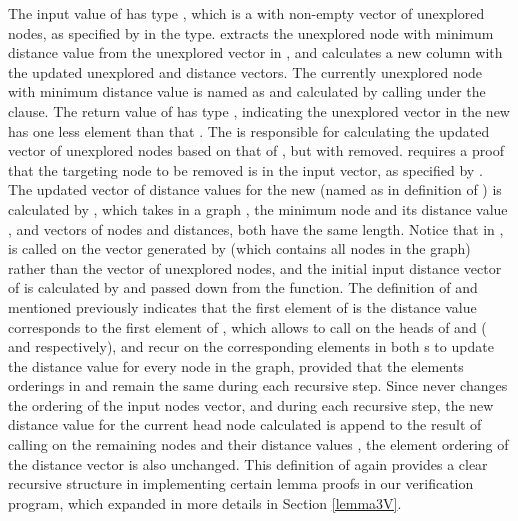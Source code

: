 The input value  of  has type , which is a  with non-empty vector of unexplored nodes, as specified by  in the type.  extracts the unexplored node with minimum distance value from the unexplored vector in , and calculates a new column with the updated unexplored and distance vectors. The currently unexplored node with minimum distance value is named as  and calculated by calling  under the  clause. The return value of  has type , indicating the unexplored vector in the new  has one less element than that . The  is responsible for calculating the updated vector of unexplored nodes based on that of , but with  removed.  requires a proof that the targeting node to be removed is in the input vector, as specified by . 
\\

The updated vector of distance values for the new (named as  in definition of ) is calculated by , which takes in a graph , the minimum node  and its distance value , and vectors of nodes and distances, both have the same length. Notice that in ,  is called on the vector generated by  (which contains all nodes in the graph) rather than the vector of unexplored nodes, and the initial input distance vector of  is calculated by  and passed down from the  function. The definition of  and  mentioned previously indicates that the first element of  is the distance value corresponds to the first element of , which allows  to call  on the heads of  and  ( and  respectively), and recur on the corresponding elements in both s to update the distance value for every node in the graph, provided that the elements orderings in  and  remain the same during each recursive step. Since  never changes the ordering of the input nodes vector, and during each recursive step, the new distance value for the current head node  calculated is append to the result of calling  on the remaining nodes  and their distance values , the element ordering of the distance vector is also unchanged. This definition of  again provides a clear recursive structure in implementing certain lemma proofs in our verification program, which expanded in more details in Section \ref{lemma3V}.
\\

